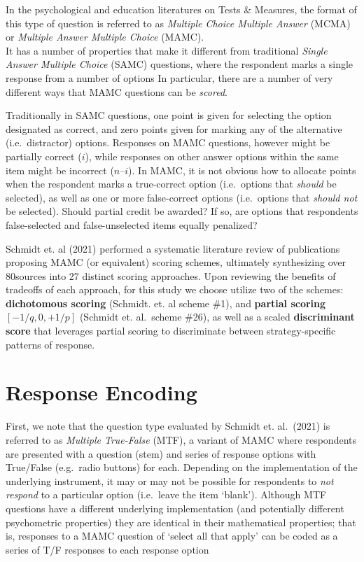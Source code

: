 \documentclass[
  letterpaper,
  DIV=11,
  numbers=noendperiod]{scrreprt}
\begin{document}
In the psychological and education literatures on Tests \& Measures, the
format of this type of question is referred to as \emph{Multiple Choice
Multiple Answer} (MCMA) or \emph{Multiple Answer Multiple Choice}
(MAMC).\\
It has a number of properties that make it different from traditional
\emph{Single Answer Multiple Choice} (SAMC) questions, where the
respondent marks a single response from a number of options In
particular, there are a number of very different ways that MAMC
questions can be \emph{scored}.

Traditionally in SAMC questions, one point is given for selecting the
option designated as correct, and zero points given for marking any of
the alternative (i.e.~distractor) options. Responses on MAMC questions,
however might be partially correct (\(i\)), while responses on other
answer options within the same item might be incorrect (\(n – i\)). In
MAMC, it is not obvious how to allocate points when the respondent marks
a true-correct option (i.e.~options that \emph{should} be selected), as
well as one or more false-correct options (i.e.~options that
\emph{should not} be selected). Should partial credit be awarded? If so,
are options that respondents false-selected and false-unselected items
equally penalized?

Schmidt et. al (2021) performed a systematic literature review of
publications proposing MAMC (or equivalent) scoring schemes, ultimately
synthesizing over 80sources into 27 distinct scoring approaches. Upon
reviewing the benefits of tradeoffs of each approach, for this study we
choose utilize two of the schemes: \textbf{dichotomous scoring}
(Schmidt. et. al scheme \#1), and \textbf{partial scoring}
\([-1/q,0, +1/p]\) (Schmidt et. al.~scheme \#26), as well as a scaled
\textbf{discriminant score} that leverages partial scoring to
discriminate between strategy-specific patterns of response.

\hypertarget{response-encoding}{%
\section{Response Encoding}\label{response-encoding}}

First, we note that the question type evaluated by Schmidt et.
al.~(2021) is referred to as \emph{Multiple True-False} (MTF), a variant
of MAMC where respondents are presented with a question (stem) and
series of response options with True/False (e.g.~radio buttons) for
each. Depending on the implementation of the underlying instrument, it
may or may not be possible for respondents to \emph{not respond} to a
particular option (i.e.~leave the item `blank'). Although MTF questions
have a different underlying implementation (and potentially different
psychometric properties) they are identical in their mathematical
properties; that is, responses to a MAMC question of `select all that
apply' can be coded as a series of T/F responses to each response option
\end{document}
